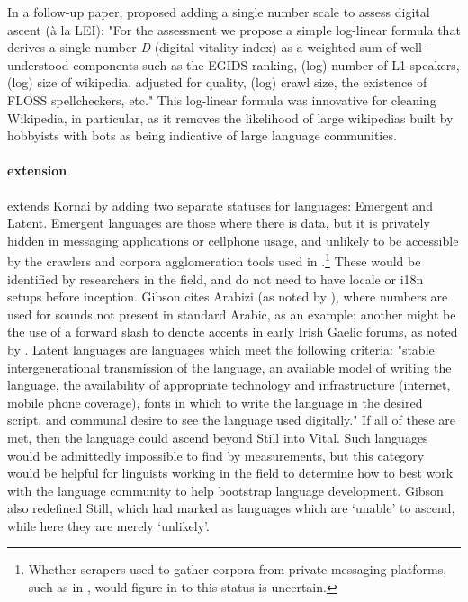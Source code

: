 In a follow-up paper, \citet{kornai2015new} proposed adding a single number scale to assess digital ascent (\`a la LEI): "For the assessment we propose a simple log-linear formula that derives a single number {\emph D} (digital vitality index) as a weighted sum of well-understood components such as the EGIDS ranking, (log) number of L1 speakers, (log) size of wikipedia, adjusted for quality, (log) crawl size, the existence of FLOSS spellcheckers, etc." %
This log-linear formula was innovative for cleaning Wikipedia, in particular, as it removes the likelihood of large wikipedias built by hobbyists with bots as being indicative of large language communities.

\paragraph{ extension}

\citet{gibson2016assessing} extends Kornai by adding two separate statuses for languages: Emergent and Latent. Emergent languages are those where there is data, but it is privately hidden in messaging applications or cellphone usage, and unlikely to be accessible by the crawlers and corpora agglomeration tools used in \citet{kornai2013digital}.\footnote{Whether scrapers used to gather corpora from private messaging platforms, such as in \citet{littauerfacebook}, would figure in to this status is uncertain.} These would be identified by researchers in the field, and do not need to have locale or i18n setups before inception. Gibson cites Arabizi (as noted by \citet{darwish2013arabizi}), where numbers are used for sounds not present in standard Arabic, as an example; another might be the use of a forward slash to denote accents in early Irish Gaelic forums, as noted by \citet{scannell2007crubadan}. Latent languages are languages which meet the following criteria: "stable intergenerational transmission of the language, an available model of writing the language, the availability of appropriate technology and infrastructure (internet, mobile phone coverage), fonts in which to write the language in the desired script, and communal desire to see the language used digitally." If all of these are met, then the language could ascend beyond Still into Vital. Such languages would be admittedly impossible to find by measurements, but this category would be helpful for linguists working in the field to determine how to best work with the language community to help bootstrap language development. Gibson also redefined Still, which \citet{kornai2013digital} had marked as languages which are `unable' to ascend, while here they are merely `unlikely'.

